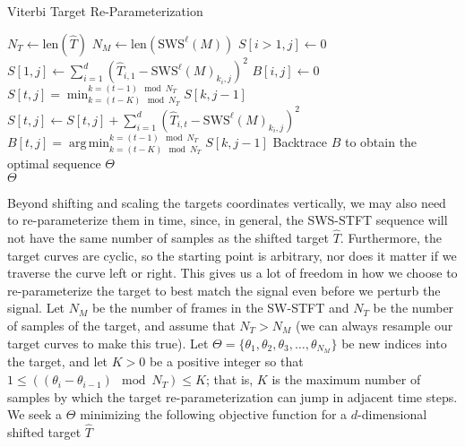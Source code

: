 \documentclass[runningheads]{llncs}
\DeclareMathOperator*{\argmin}{arg\,min}
\begin{document}
\algrenewcommand\algorithmicindent{0.8em}%
\begin{algorithm}
  \caption{Viterbi Target Re-Parameterization}

  \begin{algorithmic}[1]
    \State $N_T \gets \text{len}(\hat{T})$ 
    \State $N_M \gets \text{len}(\text{SWS}^{\ell}(M))$ 
    \State $S[i>1, j] \gets 0$ 
    \State $S[1, j] \gets \sum_{i=1}^d (\hat{T}_{i, 1} - \text{SWS}^{\ell} (M)_{k_i, j})^2$
    \State $B[i, j] \gets 0$ 
            \State $S[t, j] = \min_{k=(t-K) \mod N_T} ^ {k=(t-1) \mod N_T} S[k, j-1] $ 
            \State $S[t, j] \gets S[t, j] + \sum_{i=1}^d (\hat{T}_{i, t} - \text{SWS}^{\ell} (M)_{k_i, j})^2$ 
            \State $B[t, j] = \argmin_{k=(t-K) \mod N_T} ^ {k=(t-1) \mod N_T} S[k, j-1] $ 
        \EndFor
    \EndFor
    \State Backtrace $B$ to obtain the optimal sequence $\Theta$ \\
    \Return $\Theta$
    \EndProcedure
  \end{algorithmic}
  \label{alg:viterbiwarp}
\end{algorithm}

Beyond shifting and scaling the targets coordinates vertically, we may also need to re-parameterize them in time, since, in general, the SWS-STFT sequence will not have the same number of samples as the shifted target $\hat{T}$.  Furthermore, the target curves are cyclic, so the starting point is arbitrary, nor does it matter if we traverse the curve left or right.  This gives us a lot of freedom in how we choose to re-parameterize the target to best match the signal even before we perturb the signal.  Let $N_M$ be the number of frames in the SW-STFT and $N_T$ be the number of samples of the target, and assume that $N_T > N_M$ (we can always resample our target curves to make this true).  Let $\Theta = \{ \theta_1, \theta_2, \theta_3, \hdots, \theta_{N_M} \}$ be new indices into the target, and let $K > 0$ be a positive integer so that $1 \leq \left( (\theta_i - \theta_{i-1}) \mod N_T \right) \leq K$; that is, $K$ is the maximum number of samples by which the target re-parameterization can jump in adjacent time steps.  We seek a $\Theta$ minimizing the following objective function for a $d$-dimensional shifted target $\hat{T}$
\end{document}
